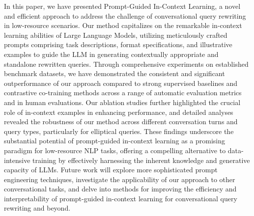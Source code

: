 In this paper, we have presented Prompt-Guided In-Context Learning, a novel and efficient approach to address the challenge of conversational query rewriting in low-resource scenarios.  Our method capitalizes on the remarkable in-context learning abilities of Large Language Models, utilizing meticulously crafted prompts comprising task descriptions, format specifications, and illustrative examples to guide the LLM in generating contextually appropriate and standalone rewritten queries.  Through comprehensive experiments on established benchmark datasets, we have demonstrated the consistent and significant outperformance of our approach compared to strong supervised baselines and contrastive co-training methods across a range of automatic evaluation metrics and in human evaluations.  Our ablation studies further highlighted the crucial role of in-context examples in enhancing performance, and detailed analyses revealed the robustness of our method across different conversation turns and query types, particularly for elliptical queries.  These findings underscore the substantial potential of prompt-guided in-context learning as a promising paradigm for low-resource NLP tasks, offering a compelling alternative to data-intensive training by effectively harnessing the inherent knowledge and generative capacity of LLMs.  Future work will explore more sophisticated prompt engineering techniques, investigate the applicability of our approach to other conversational tasks, and delve into methods for improving the efficiency and interpretability of prompt-guided in-context learning for conversational query rewriting and beyond.

